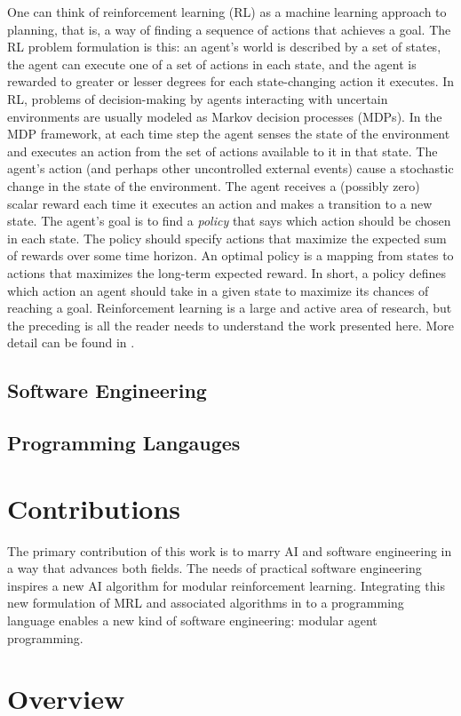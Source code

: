 One can think of reinforcement learning (RL) as a machine learning approach to planning, that is, a way of finding a sequence of actions that achieves a goal.  The RL problem formulation is this: an agent's world is described by a set of states, the agent can execute one of a set of actions in each state, and the agent is rewarded to greater or lesser degrees for each state-changing action it executes. In RL, problems of decision-making by agents interacting with uncertain environments are usually modeled as Markov decision processes (MDPs). In the MDP framework, at each time step the agent senses the state of the environment and executes an action from the set of actions available to it in that state. The agent's action (and perhaps other uncontrolled external events) cause a stochastic change in the state of the environment. The agent receives a (possibly zero) scalar reward each time it executes an action and makes a transition to a new state. The agent's goal is to find a {\it policy} that says which action should be chosen in each state.  The policy should specify actions that maximize the expected sum of rewards over some time horizon. An optimal policy is a mapping from states to actions that maximizes the long-term expected reward.  In short, a policy defines which action an agent should take in a given state to maximize its chances of reaching a goal.  Reinforcement learning is a large and active area of research, but the preceding is all the reader needs to understand the work presented here.  More detail can be found in \cite{sutton1998reinforcement,kaelbling1996reinforcement}.

\subsection{Software Engineering}



\subsection{Programming Langauges}



\section{Contributions}

The primary contribution of this work is to marry AI and software engineering in a way that advances both fields. The needs of practical software engineering inspires a new AI algorithm for modular reinforcement learning. Integrating this new formulation of MRL and associated algorithms in to a programming language enables a new kind of software engineering: modular agent programming.


\section{Overview}

